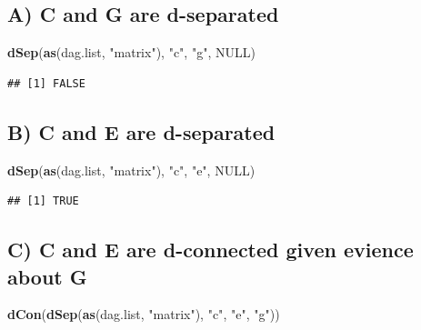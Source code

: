 \documentclass[]{article}
\newenvironment{Shaded}{\begin{snugshade}}{\end{snugshade}}
\newcommand{\KeywordTok}[1]{\textcolor[rgb]{0.13,0.29,0.53}{\textbf{{#1}}}}
\newcommand{\StringTok}[1]{\textcolor[rgb]{0.31,0.60,0.02}{{#1}}}
\newcommand{\OtherTok}[1]{\textcolor[rgb]{0.56,0.35,0.01}{{#1}}}
\newcommand{\NormalTok}[1]{{#1}}
\begin{document}
\subsection{A) C and G are d-separated}\label{a-c-and-g-are-d-separated}

\begin{Shaded}
\begin{Highlighting}[]
\KeywordTok{dSep}\NormalTok{(}\KeywordTok{as}\NormalTok{(dag.list, }\StringTok{"matrix"}\NormalTok{), }\StringTok{"c"}\NormalTok{, }\StringTok{"g"}\NormalTok{, }\OtherTok{NULL}\NormalTok{)}
\end{Highlighting}
\end{Shaded}

\begin{verbatim}
## [1] FALSE
\end{verbatim}

\subsection{B) C and E are d-separated}\label{b-c-and-e-are-d-separated}

\begin{Shaded}
\begin{Highlighting}[]
\KeywordTok{dSep}\NormalTok{(}\KeywordTok{as}\NormalTok{(dag.list, }\StringTok{"matrix"}\NormalTok{), }\StringTok{"c"}\NormalTok{, }\StringTok{"e"}\NormalTok{, }\OtherTok{NULL}\NormalTok{)}
\end{Highlighting}
\end{Shaded}

\begin{verbatim}
## [1] TRUE
\end{verbatim}

\subsection{C) C and E are d-connected given evience about
G}\label{c-c-and-e-are-d-connected-given-evience-about-g}

\begin{Shaded}
\begin{Highlighting}[]
\KeywordTok{dCon}\NormalTok{(}\KeywordTok{dSep}\NormalTok{(}\KeywordTok{as}\NormalTok{(dag.list, }\StringTok{"matrix"}\NormalTok{), }\StringTok{"c"}\NormalTok{, }\StringTok{"e"}\NormalTok{, }\StringTok{"g"}\NormalTok{))}
\end{Highlighting}
\end{Shaded}
\end{document}
